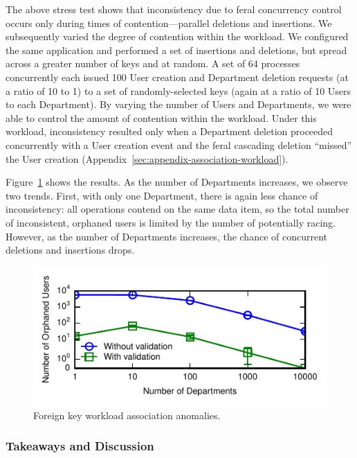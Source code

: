 The above stress test shows that inconsistency due to feral
concurrency control occurs only during times of contention---parallel
deletions and insertions. We subsequently varied the degree of
contention within the workload. We configured the same application and
performed a set of insertions and deletions, but spread across a
greater number of keys and at random. A set of 64 processes
concurrently each issued 100 User creation and Department deletion
requests (at a ratio of 10 to 1) to a set of randomly-selected keys
(again at a ratio of 10 Users to each Department). By varying the
number of Users and Departments, we were able to control the amount of
contention within the workload. Under this workload, inconsistency
resulted only when a Department deletion proceeded concurrently with a
User creation event and the feral cascading deletion ``missed'' the
User creation (Appendix~\ref{sec:appendix-association-workload}).

Figure~\ref{fig:fk-workload} shows the results. As the number of
Departments increases, we observe two trends. First, with only one
Department, there is again less chance of inconsistency: all
operations contend on the same data item, so the total number of
inconsistent, orphaned users is limited by the number of potentially
racing. However, as the number of Departments increases, the chance of
concurrent deletions and insertions drops.

\begin{figure}
\includegraphics[width=\figscale\columnwidth]{figs/fk-workload-violations.pdf}
\caption{Foreign key workload association anomalies.}
\label{fig:fk-workload}
\end{figure}

\subsubsection{Takeaways and Discussion}

